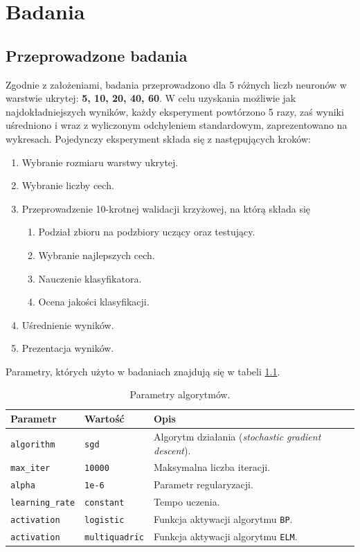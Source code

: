 \chapter{Badania}

\section{Przeprowadzone badania}

Zgodnie z założeniami, badania przeprowadzono dla 5 różnych liczb neuronów w warstwie ukrytej: \textbf{5, 10, 20, 40, 60}. W celu uzyskania możliwie jak najdokładniejszych wyników, każdy eksperyment powtórzono 5 razy, zaś wyniki uśredniono i wraz z wyliczonym odchyleniem standardowym, zaprezentowano na wykresach. Pojedynczy eksperyment składa się z następujących kroków:

\begin{enumerate}[noitemsep]
	\item{Wybranie rozmiaru warstwy ukrytej.}
	\item{Wybranie liczby cech.}
	\item{Przeprowadzenie 10-krotnej walidacji krzyżowej, na którą składa się}
	\begin{enumerate}
		\item{Podział zbioru na podzbiory uczący oraz testujący.}
		\item{Wybranie najlepszych cech.}
		\item{Nauczenie klasyfikatora.}
		\item{Ocena jakości klasyfikacji.}
	\end{enumerate}
	\item{Uśrednienie wyników.}
	\item{Prezentacja wyników.}
\end{enumerate}

Parametry, których użyto w badaniach znajdują się w tabeli \ref{tab:params}.

\begin{table}[h!]
    \centering
    \caption{Parametry algorytmów.}
    \label{tab:params}
    \begin{tabular}{p{3cm}p{3cm}p{9cm}}
        \toprule
        \textbf{Parametr} & \textbf{Wartość} & \textbf{Opis} \\
        \midrule
        \texttt{algorithm} & \texttt{sgd} & Algorytm działania (\textit{stochastic gradient descent}). \\
        \texttt{max\_iter} & \texttt{10000} & Maksymalna liczba iteracji. \\
        \texttt{alpha} & \texttt{1e-6} & Parametr regularyzacji. \\
        \texttt{learning\_rate} & \texttt{constant} & Tempo uczenia. \\
        \texttt{activation} & \texttt{logistic} & Funkcja aktywacji algorytmu \texttt{BP}. \\
        \texttt{activation} & \texttt{multiquadric} & Funkcja aktywacji algorytmu \texttt{ELM}. \\
        \bottomrule
    \end{tabular}
\end{table}

